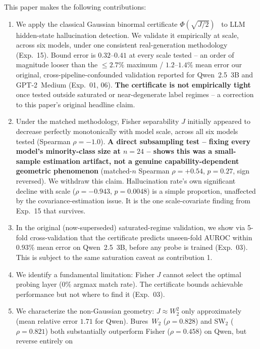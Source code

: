 \documentclass[10pt,twocolumn]{article}
\begin{document}
This paper makes the following contributions:
\begin{enumerate}[leftmargin=*, topsep=2pt, itemsep=1pt]
  \item We apply the classical Gaussian binormal certificate
    $\Phi(\sqrt{J/2})$~\citep{green1966signal,bamber1975area,hanley1982meaning}
    to LLM hidden-state hallucination detection. We validate it
    empirically at scale, across six models, under one consistent
    real-generation methodology (Exp.~15). Bound error is $0.32$--$0.41$
    at every scale tested -- an order of magnitude looser than the
    $\leq 2.7\%$ maximum / $1.2$--$1.4\%$ mean error our original,
    cross-pipeline-confounded validation reported for Qwen~2.5~3B and
    GPT-2~Medium (Exp.~01, 06). \textbf{The certificate is not
    empirically tight} once tested outside saturated or near-degenerate
    label regimes -- a correction to this paper's original headline
    claim.
  \item Under the matched methodology, Fisher separability $J$ initially
    appeared to decrease perfectly monotonically with model scale, across
    all six models tested (Spearman $\rho=-1.0$). \textbf{A direct
    subsampling test -- fixing every model's minority-class size at
    $n=24$ -- shows this was a small-sample estimation artifact, not a
    genuine capability-dependent geometric phenomenon} (matched-$n$
    Spearman $\rho=+0.54$, $p=0.27$, sign reversed). We withdraw this
    claim. Hallucination rate's own significant decline with scale
    ($\rho=-0.943$, $p=0.0048$) is a simple proportion, unaffected by the
    covariance-estimation issue. It is the one scale-covariate finding
    from Exp.~15 that survives.
  \item In the original (now-superseded) saturated-regime validation, we
    show via 5-fold cross-validation that the certificate predicts
    unseen-fold AUROC within $0.93\%$ mean error on Qwen~2.5~3B, before
    any probe is trained (Exp.~03). This is subject to the same
    saturation caveat as contribution 1.
  \item We identify a fundamental limitation: Fisher $J$ cannot select the
    optimal probing layer (0\% argmax match rate).  The certificate bounds
    achievable performance but not where to find it (Exp.~03).
  \item We characterize the non-Gaussian geometry: $J \approx W_2^2$ only
    approximately (mean relative error $1.71$ for Qwen). Bures~$W_2$
    ($\rho = 0.828$) and SW$_2$ ($\rho = 0.821$) both substantially
    outperform Fisher ($\rho = 0.458$) on Qwen, but reverse entirely on

\end{enumerate}
\end{document}

